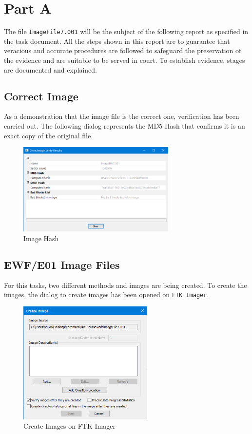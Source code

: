 
\section{Part A}
\label{s:task1-part-a}
The file \lstinline{ImageFile7.001} will be the subject of the following report
as specified in the task document. All the steps shown in this report are to
guarantee that veracious and accurate procedures are followed to safeguard the
preservation of the evidence and are suitable to be served in court. To
establish evidence, stages are documented and explained.

\subsection{Correct Image}
\label{s:task1-part-a-correct-image}
As a demonstration that the image file is the correct one, verification has been
carried out. The following dialog represents the MD5 Hash that confirms it is an
exact copy of the original file.

\begin{figure}[H]
  \centering
  \includegraphics[width=0.7\textwidth]{figures/hash}
  \caption{Image Hash}
  \label{f:image-hash}
\end{figure}

\subsection{EWF/E01 Image Files}
\label{s:task1-part-a-ewf-e01-file}
For this tasks, two different methods and images are being created. To create
the images, the dialog to create images has been opened on \lstinline{FTK Imager}.

\begin{figure}[H]
  \centering
  \includegraphics[width=0.6\textwidth]{figures/create-images}
  \caption{Create Images on FTK Imager}
  \label{f:create-images}
\end{figure}

